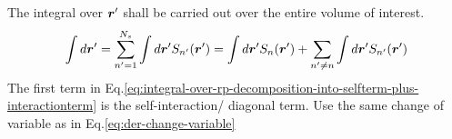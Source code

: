 \documentclass [10pt,letterpaper]{article}
\newcommand{\unitvectorsym}[1]{\hat{\vectorsym{#1}}}
\begin{document}
The integral over $\vectorsym{r}^\prime$ shall be carried out over the entire volume of interest.
\begin{equation} \label{eq:integral-over-rp-decomposition-into-selfterm-plus-interactionterm}
	\begin{split}
		\int d\vectorsym{r}^\prime
		=
		\sum \limits_{n^\prime=1}^{N_s}
		\int d\vectorsym{r}^\prime
		S_{n^\prime}(\vectorsym{r}^\prime)
		=
		\int d\vectorsym{r}^\prime
		S_n(\vectorsym{r}^\prime)
		+
		\sum \limits_{n^\prime \neq n}
		\int d\vectorsym{r}^\prime
		S_{n^\prime}(\vectorsym{r}^\prime)
	\end{split}
\end{equation}
The first term in Eq.\eqref{eq:integral-over-rp-decomposition-into-selfterm-plus-interactionterm} is the self-interaction/ diagonal term. Use the same change of variable as in Eq.\eqref{eq:der-change-variable}
\end{document}
